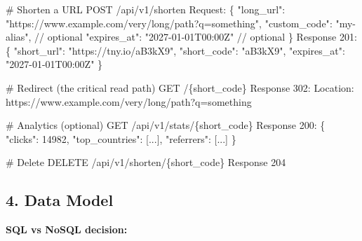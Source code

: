 \documentclass[11pt]{article}
\newenvironment{Shaded}{\begin{snugshade}}{\end{snugshade}}
\newcommand{\BuiltInTok}[1]{\textcolor[rgb]{0.50,0.55,0.55}{#1}}
\newcommand{\CommentTok}[1]{\textcolor[rgb]{0.48,0.49,0.49}{#1}}
\newcommand{\DecValTok}[1]{\textcolor[rgb]{0.96,0.45,0.00}{#1}}
\newcommand{\NormalTok}[1]{\textcolor[rgb]{0.81,0.81,0.76}{#1}}
\newcommand{\OperatorTok}[1]{\textcolor[rgb]{0.81,0.81,0.76}{#1}}
\newcommand{\StringTok}[1]{\textcolor[rgb]{0.96,0.31,0.31}{#1}}
\begin{document}
\begin{Shaded}
\begin{Highlighting}[]
\CommentTok{\# Shorten a URL}
\NormalTok{POST }\OperatorTok{/}\NormalTok{api}\OperatorTok{/}\NormalTok{v1}\OperatorTok{/}\NormalTok{shorten}
\NormalTok{Request:}
\NormalTok{  \{}
    \StringTok{"long\_url"}\NormalTok{:   }\StringTok{"https://www.example.com/very/long/path?q=something"}\NormalTok{,}
    \StringTok{"custom\_code"}\NormalTok{: }\StringTok{"my{-}alias"}\NormalTok{,          }\OperatorTok{//}\NormalTok{ optional}
    \StringTok{"expires\_at"}\NormalTok{:  }\StringTok{"2027{-}01{-}01T00:00Z"} \OperatorTok{//}\NormalTok{ optional}
\NormalTok{  \}}
\NormalTok{Response }\DecValTok{201}\NormalTok{:}
\NormalTok{  \{}
    \StringTok{"short\_url"}\NormalTok{: }\StringTok{"https://tny.io/aB3kX9"}\NormalTok{,}
    \StringTok{"short\_code"}\NormalTok{: }\StringTok{"aB3kX9"}\NormalTok{,}
    \StringTok{"expires\_at"}\NormalTok{: }\StringTok{"2027{-}01{-}01T00:00Z"}
\NormalTok{  \}}

\CommentTok{\# Redirect (the critical read path)}
\NormalTok{GET }\OperatorTok{/}\NormalTok{\{short\_code\}}
\NormalTok{Response }\DecValTok{302}\NormalTok{:}
\NormalTok{  Location: https:}\OperatorTok{//}\NormalTok{www.example.com}\OperatorTok{/}\NormalTok{very}\OperatorTok{/}\BuiltInTok{long}\OperatorTok{/}\NormalTok{path?q}\OperatorTok{=}\NormalTok{something}

\CommentTok{\# Analytics (optional)}
\NormalTok{GET }\OperatorTok{/}\NormalTok{api}\OperatorTok{/}\NormalTok{v1}\OperatorTok{/}\NormalTok{stats}\OperatorTok{/}\NormalTok{\{short\_code\}}
\NormalTok{Response }\DecValTok{200}\NormalTok{:}
\NormalTok{  \{}
    \StringTok{"clicks"}\NormalTok{: }\DecValTok{14982}\NormalTok{,}
    \StringTok{"top\_countries"}\NormalTok{: [...],}
    \StringTok{"referrers"}\NormalTok{: [...]}
\NormalTok{  \}}

\CommentTok{\# Delete}
\NormalTok{DELETE }\OperatorTok{/}\NormalTok{api}\OperatorTok{/}\NormalTok{v1}\OperatorTok{/}\NormalTok{shorten}\OperatorTok{/}\NormalTok{\{short\_code\}}
\NormalTok{Response }\DecValTok{204}
\end{Highlighting}
\end{Shaded}

\subsection{4. Data Model}\label{4-data-model}

\textbf{SQL vs NoSQL decision:}
\end{document}
